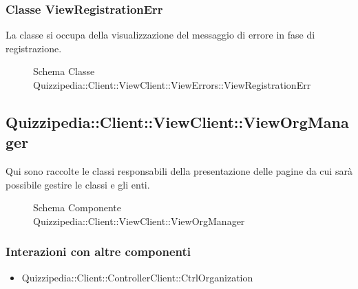 \subsubsection{Classe ViewRegistrationErr}
La classe si occupa della visualizzazione del messaggio di errore in fase di registrazione.
\begin{figure}[H]
\centering
\noindent{}
\caption[Schema Classe ViewRegistrationErr]{Schema Classe Quizzipedia::Client::ViewClient::ViewErrors::ViewRegistrationErr}
\end{figure}
\subsection{Quizzipedia::Client::ViewClient::ViewOrgManager}
Qui sono raccolte le classi responsabili della presentazione delle pagine da cui sarà possibile gestire le classi e gli enti.
\begin{figure}[H]
\centering
\noindent{}
\caption[Schema Componente Quizzipedia::Client::ViewClient::ViewOrgManager]{Schema Componente Quizzipedia::Client::ViewClient::ViewOrgManager}
\end{figure}
\subsubsection{Interazioni con altre componenti}
\begin{itemize}
\item Quizzipedia::Client::ControllerClient::CtrlOrganization
\end{itemize}
